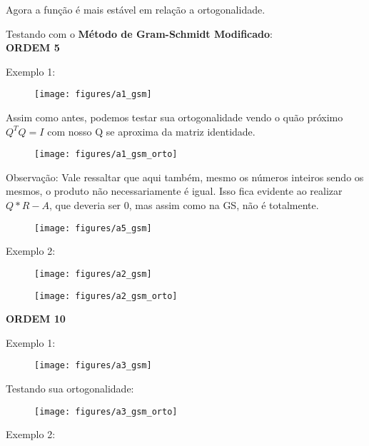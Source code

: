 \documentclass[leqno]{article}
\numberwithin{equation}{section}
\begin{document}
	\noindent Agora a função é mais estável em relação a ortogonalidade.
	\vspace{3mm}
	
	Testando com o \textbf{Método de Gram-Schmidt Modificado}:\\
	
	\textbf{{\large ORDEM 5}}
	
	Exemplo 1:
	
	\begin{figure}[H]
		\centering
		\texttt{[image: figures/a1\_gsm]}		
	\end{figure}
	
	Assim como antes, podemos testar sua ortogonalidade vendo o quão próximo $Q^TQ = I$ com nosso Q se aproxima da matriz identidade.
	
	\begin{figure}[H]
		\centering
		\texttt{[image: figures/a1\_gsm\_orto]}		
	\end{figure}

	Observação: Vale ressaltar que aqui também, mesmo os números inteiros sendo os mesmos, o produto não necessariamente é igual. Isso fica evidente ao realizar $Q*R - A$, que deveria ser 0, mas assim como na GS, não é totalmente.
	
	\begin{figure}[H]
		\centering
		\texttt{[image: figures/a5\_gsm]}		
	\end{figure}
	
	Exemplo 2:
	
	\begin{figure}[H]
		\centering
		\texttt{[image: figures/a2\_gsm]}
	\end{figure}
	
	\begin{figure}[H]
		\centering
		\texttt{[image: figures/a2\_gsm\_orto]}		
	\end{figure}

	\textbf{{\large ORDEM 10}}
	
	Exemplo 1:
	
	\begin{figure}[H]
		\centering
		\texttt{[image: figures/a3\_gsm]}		
	\end{figure}
	
	
	Testando sua ortogonalidade:
	
	\begin{figure}[H]
		\centering
		\texttt{[image: figures/a3\_gsm\_orto]}		
	\end{figure}
	\newpage
	Exemplo 2:
	
\end{document}
